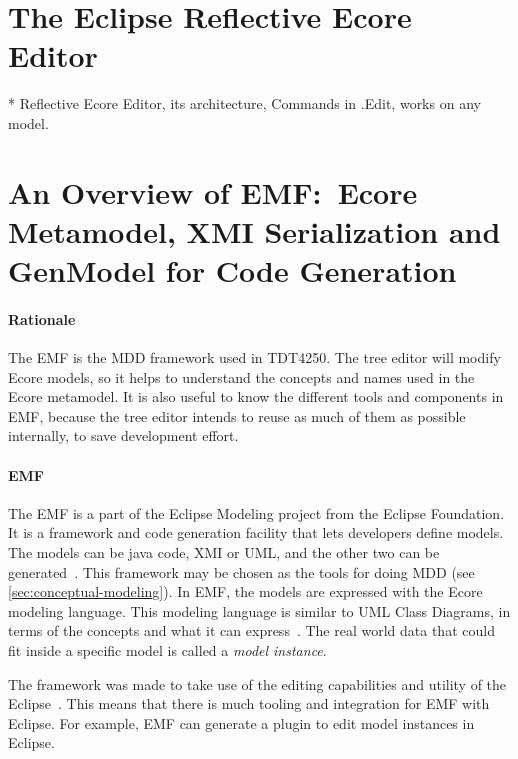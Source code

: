 \section{The Eclipse Reflective Ecore Editor}

* Reflective Ecore Editor, its architecture, Commands in .Edit, works on any model.

\section{An Overview of EMF:\ Ecore Metamodel, XMI Serialization and GenModel for Code Generation}\label{sec:emf-metamodel}

\paragraph{Rationale}
The \acrfull{EMF} is the \acrlong{MDD} framework used in \gls{TDT4250}.
The tree editor will modify \gls{Ecore} models, so it helps to understand the concepts and names used in the \gls{Ecore} metamodel.
It is also useful to know the different tools and components in \acrshort{EMF}, because the tree editor intends to reuse as much of them as possible internally, to save development effort.

\paragraph{\acrlong{EMF}}
The \acrfull{EMF} is a part of the Eclipse Modeling project from the Eclipse Foundation.
It is a framework and code generation facility that lets developers define models.
The models can be java code, \gls{XMI} or \gls{UML}, and the other two can be generated~\cite[p.~14]{edmerksEMFEclipseModeling2009}.
This framework may be chosen as the tools for doing \acrlong{MDD} (see \cref{sec:conceptual-modeling}).
In EMF, the models are expressed with the \gls{Ecore} modeling language.
This modeling language is similar to \gls{UML} Class Diagrams, in terms of the concepts and what it can express~\cite[p.~16]{edmerksEMFEclipseModeling2009}.
The real world data that could fit inside a specific model is called a \textit{model instance}.

The framework was made to take use of the editing capabilities and utility of the \gls{Eclipse}~\cite{edmerksEMFEclipseModeling2009}.
This means that there is much tooling and integration for \acrshort{EMF} with \gls{Eclipse}.
For example, EMF can generate a plugin to edit model instances in \gls{Eclipse}.

